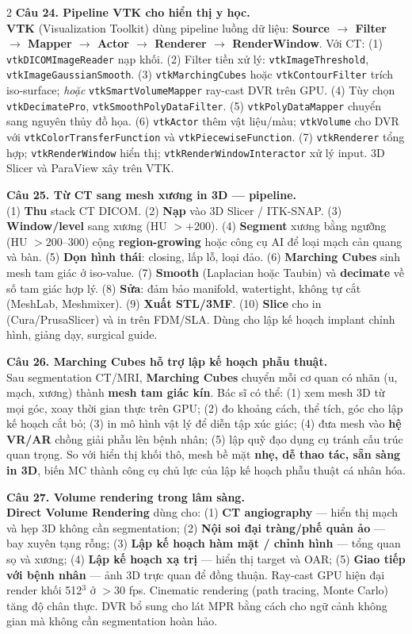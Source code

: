 \begin{paracol}{2}
\textbf{Câu 24. Pipeline VTK cho hiển thị y học.}\\
\textbf{VTK} (Visualization Toolkit) dùng pipeline luồng dữ liệu: \textbf{Source $\to$ Filter $\to$ Mapper $\to$ Actor $\to$ Renderer $\to$ RenderWindow}. Với CT: (1) \texttt{vtkDICOMImageReader} nạp khối. (2) Filter tiền xử lý: \texttt{vtkImageThreshold}, \texttt{vtkImageGaussianSmooth}. (3) \texttt{vtkMarchingCubes} hoặc \texttt{vtkContourFilter} trích iso-surface; \textit{hoặc} \texttt{vtkSmartVolumeMapper} ray-cast DVR trên GPU. (4) Tùy chọn \texttt{vtkDecimatePro}, \texttt{vtkSmoothPolyDataFilter}. (5) \texttt{vtkPolyDataMapper} chuyển sang nguyên thủy đồ họa. (6) \texttt{vtkActor} thêm vật liệu/màu; \texttt{vtkVolume} cho DVR với \texttt{vtkColorTransferFunction} và \texttt{vtkPiecewiseFunction}. (7) \texttt{vtkRenderer} tổng hợp; \texttt{vtkRenderWindow} hiển thị; \texttt{vtkRenderWindowInteractor} xử lý input. 3D Slicer và ParaView xây trên VTK.

\textbf{Câu 25. Từ CT sang mesh xương in 3D --- pipeline.}\\
(1) \textbf{Thu} stack CT DICOM. (2) \textbf{Nạp} vào 3D Slicer / ITK-SNAP. (3) \textbf{Window/level} sang xương (HU $> +200$). (4) \textbf{Segment} xương bằng ngưỡng (HU $> 200$--300) cộng \textbf{region-growing} hoặc công cụ AI để loại mạch cản quang và bàn. (5) \textbf{Dọn hình thái}: closing, lấp lỗ, loại đảo. (6) \textbf{Marching Cubes} sinh mesh tam giác ở iso-value. (7) \textbf{Smooth} (Laplacian hoặc Taubin) và \textbf{decimate} về số tam giác hợp lý. (8) \textbf{Sửa}: đảm bảo manifold, watertight, không tự cắt (MeshLab, Meshmixer). (9) \textbf{Xuất STL/3MF}. (10) \textbf{Slice} cho in (Cura/PrusaSlicer) và in trên FDM/SLA. Dùng cho lập kế hoạch implant chỉnh hình, giảng dạy, surgical guide.

\textbf{Câu 26. Marching Cubes hỗ trợ lập kế hoạch phẫu thuật.}\\
Sau segmentation CT/MRI, \textbf{Marching Cubes} chuyển mỗi cơ quan có nhãn (u, mạch, xương) thành \textbf{mesh tam giác kín}. Bác sĩ có thể: (1) xem mesh 3D từ mọi góc, xoay thời gian thực trên GPU; (2) đo khoảng cách, thể tích, góc cho lập kế hoạch cắt bỏ; (3) in mô hình vật lý để diễn tập xúc giác; (4) đưa mesh vào \textbf{hệ VR/AR} chồng giải phẫu lên bệnh nhân; (5) lập quỹ đạo dụng cụ tránh cấu trúc quan trọng. So với hiển thị khối thô, mesh bề mặt \textbf{nhẹ, dễ thao tác, sẵn sàng in 3D}, biến MC thành công cụ chủ lực của lập kế hoạch phẫu thuật cá nhân hóa.

\textbf{Câu 27. Volume rendering trong lâm sàng.}\\
\textbf{Direct Volume Rendering} dùng cho: (1) \textbf{CT angiography} --- hiển thị mạch và hẹp 3D không cần segmentation; (2) \textbf{Nội soi đại tràng/phế quản ảo} --- bay xuyên tạng rỗng; (3) \textbf{Lập kế hoạch hàm mặt / chỉnh hình} --- tổng quan sọ và xương; (4) \textbf{Lập kế hoạch xạ trị} --- hiển thị target và OAR; (5) \textbf{Giao tiếp với bệnh nhân} --- ảnh 3D trực quan để đồng thuận. Ray-cast GPU hiện đại render khối 512$^3$ ở $>$30 fps. Cinematic rendering (path tracing, Monte Carlo) tăng độ chân thực. DVR bổ sung cho lát MPR bằng cách cho ngữ cảnh không gian mà không cần segmentation hoàn hảo.


\end{paracol}
